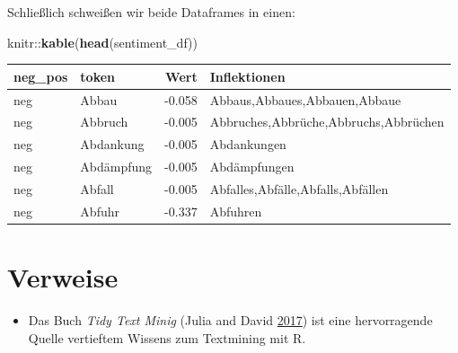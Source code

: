 \documentclass[12pt,]{book}
\makeatletter
\newenvironment{Shaded}{\begin{snugshade}}{\end{snugshade}}
\newcommand{\KeywordTok}[1]{\textcolor[rgb]{0.13,0.29,0.53}{\textbf{{#1}}}}
\newcommand{\DataTypeTok}[1]{\textcolor[rgb]{0.13,0.29,0.53}{{#1}}}
\newcommand{\StringTok}[1]{\textcolor[rgb]{0.31,0.60,0.02}{{#1}}}
\newcommand{\NormalTok}[1]{{#1}}
\providecommand{\tightlist}{%
  \setlength{\itemsep}{0pt}\setlength{\parskip}{0pt}}
\newenvironment{kframe}{%
\medskip{}
\setlength{\fboxsep}{.8em}
 \def\at@end@of@kframe{}%
 \ifinner\ifhmode%
  \def\at@end@of@kframe{\end{minipage}}%
  \begin{minipage}{\columnwidth}%
 \fi\fi%
 \def\FrameCommand##1{\hskip\@totalleftmargin \hskip-\fboxsep
 \colorbox{shadecolor}{##1}\hskip-\fboxsep
     \hskip-\linewidth \hskip-\@totalleftmargin \hskip\columnwidth}%
 \MakeFramed {\advance\hsize-\width
   \@totalleftmargin\z@ \linewidth\hsize
   \@setminipage}}%
 {\par\unskip\endMakeFramed%
 \at@end@of@kframe}
\renewenvironment{Shaded}{\begin{kframe}}{\end{kframe}}
\makeatother
\begin{document}
Schließlich schweißen wir beide Dataframes in einen:

\begin{Shaded}
\end{Shaded}

\begin{Shaded}
\begin{Highlighting}[]
\NormalTok{knitr::}\KeywordTok{kable}\NormalTok{(}\KeywordTok{head}\NormalTok{(sentiment_df))}
\end{Highlighting}
\end{Shaded}

\begin{tabular}{l|l|r|l}
\hline
neg\_pos & token & Wert & Inflektionen\\
\hline
neg & Abbau & -0.058 & Abbaus,Abbaues,Abbauen,Abbaue\\
\hline
neg & Abbruch & -0.005 & Abbruches,Abbrüche,Abbruchs,Abbrüchen\\
\hline
neg & Abdankung & -0.005 & Abdankungen\\
\hline
neg & Abdämpfung & -0.005 & Abdämpfungen\\
\hline
neg & Abfall & -0.005 & Abfalles,Abfälle,Abfalls,Abfällen\\
\hline
neg & Abfuhr & -0.337 & Abfuhren\\
\hline
\end{tabular}

\section{Verweise}\label{verweise-5}

\begin{itemize}
\tightlist
\item
  Das Buch \emph{Tidy Text Minig} (Julia and David
  \protect\hyperlink{ref-tidytextminig}{2017}) ist eine hervorragende
  Quelle vertieftem Wissens zum Textmining mit R.
\end{itemize}
\end{document}
